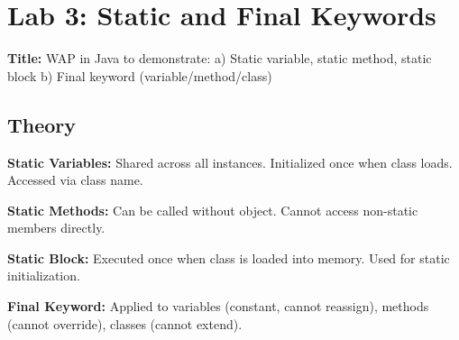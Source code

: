 \documentclass[10pt,a4paper]{article}
\begin{document}
\newpage
\section*{Lab 3: Static and Final Keywords}

\textbf{Title:} WAP in Java to demonstrate: a) Static variable, static method, static block b) Final keyword (variable/method/class)

\subsection*{Theory}
\textbf{Static Variables:} Shared across all instances. Initialized once when class loads. Accessed via class name.

\textbf{Static Methods:} Can be called without object. Cannot access non-static members directly.

\textbf{Static Block:} Executed once when class is loaded into memory. Used for static initialization.

\textbf{Final Keyword:} Applied to variables (constant, cannot reassign), methods (cannot override), classes (cannot extend).
\end{document}
